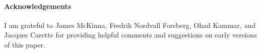 \paragraph{Acknowledgements}
I am grateful to
James McKinna,
Fredrik Nordvall Forsberg,
Ohad Kammar,
and Jacques Carette
for providing helpful comments and suggestions on early
versions of this paper.
